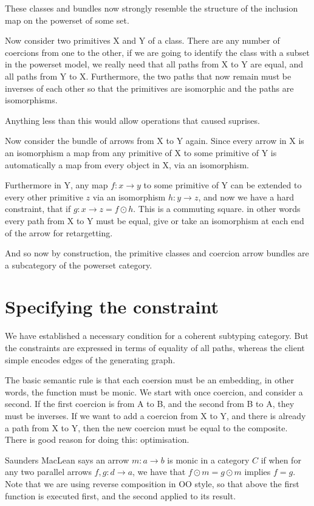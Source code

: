 \documentclass[oneside]{book}
\begin{document}
These classes and bundles now strongly resemble the structure of the
inclusion map on the powerset of some set.

Now consider two primitives X and Y of a class. There are any number
of coercions from one to the other, if we are going to identify the class
with a subset in the powerset model, we really need that all paths
from X to Y are equal, and all paths from Y to X. Furthermore,
the two paths that now remain must be inverses of each other so that
the primitives are isomorphic and the paths are isomorphisms.

Anything less than this would allow operations that caused suprises.

Now consider the bundle of arrows from X to Y again. Since every arrow
in X is an isomorphism a map from any primitive of X to some primitive
of Y is automatically a map from every object in X, via an isomorphism.

Furthermore in Y, any map $f:x\rightarrow y$ to some primitive of Y can be extended
to every other primitive $z$ via an isomorphism $h:y\rightarrow z$, and now we have a hard
constraint, that if $g:x\rightarrow z = f \odot h$. This is a commuting square. 
in other words every path from X to Y must be equal, give or take an isomorphism
at each end of the arrow for retargetting.

And so now by construction, the primitive classes and coercion arrow bundles
are a subcategory of the powerset category.

\section{Specifying the constraint}
We have established a necessary condition for a coherent subtyping
category. But the constraints are expressed in terms of equality
of all paths, whereas the client simple encodes edges of the generating
graph.

The basic semantic rule is that each coersion must be an embedding,
in other words, the function must be monic. We start with once coercion,
and consider a second. If the first coercion is from A to B, and the second
from B to A, they must be inverses. If we want to add a coercion from X to Y,
and there is already a path from X to Y, then the new coercion must be equal
to the composite. There is good reason for doing this: optimisation.

Saunders MacLean says an arrow $m: a\rightarrow b$  is monic in a category $C$
if when for any two parallel arrows $f,g: d\rightarrow a$, we have that $f\odot m = g\odot m$
implies $f=g$. Note that we are using reverse composition in OO style, so that above the first 
function is executed first, and the second applied to its result.
\end{document}
